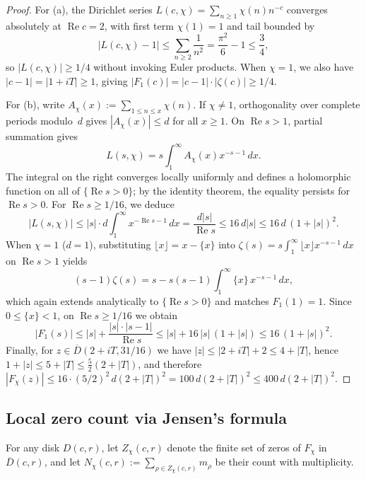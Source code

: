 \documentclass[11pt,reqno]{amsart}
\numberwithin{equation}{section}
\theoremstyle{definition}
\newcommand{\1}{\mathbf{1}}
\renewcommand{\Re}{\operatorname{Re}}
\begin{document}
\begin{proof}
For (a), the Dirichlet series $L(c, \chi) = \sum_{n \ge 1} \chi(n) n^{-c}$ converges absolutely at $\Re c = 2$, with first term $\chi(1) = 1$ and tail bounded by
\[
  \bigl|L(c, \chi) - 1\bigr| \le \sum_{n \ge 2} \frac{1}{n^2} = \frac{\pi^2}{6} - 1 \le \frac{3}{4},
\]
so $|L(c, \chi)| \ge 1/4$ without invoking Euler products. When $\chi = 1$, we also have $|c - 1| = |1 + iT| \ge 1$, giving $|F_1(c)| = |c-1|\cdot|\zeta(c)| \ge 1/4$.

For (b), write $A_\chi(x) := \sum_{1 \le n \le x} \chi(n)$. If $\chi \neq 1$, orthogonality over complete periods modulo~$d$ gives $|A_\chi(x)| \le d$ for all $x \ge 1$. On $\Re s > 1$, partial summation gives
\[
  L(s, \chi) = s \int_1^\infty A_\chi(x) x^{-s-1}\,dx.
\]
The integral on the right converges locally uniformly and defines a holomorphic function on all of $\{\Re s > 0\}$; by the identity theorem, the equality persists for $\Re s > 0$. For $\Re s \ge 1/16$, we deduce
\[
  |L(s, \chi)| \le |s| \cdot d \int_1^\infty x^{-\Re s - 1}\,dx = \frac{d |s|}{\Re s} \le 16\, d |s| \le 16\, d\,(1 + |s|)^2.
\]
When $\chi = 1$ ($d = 1$), substituting $\lfloor x \rfloor = x - \{x\}$ into $\zeta(s) = s \int_1^\infty \lfloor x\rfloor x^{-s-1}\,dx$ on $\Re s > 1$ yields
\[
  (s - 1)\zeta(s) = s - s(s - 1)\int_1^\infty \{x\}\, x^{-s-1}\,dx,
\]
which again extends analytically to $\{\Re s > 0\}$ and matches $F_1(1) = 1$. Since $0 \le \{x\} < 1$, on $\Re s \ge 1/16$ we obtain
\[
  |F_1(s)| \le |s| + \frac{|s|\cdot|s-1|}{\Re s} \le |s| + 16\,|s|\,(1+|s|) \le 16\,(1+|s|)^2.
\]
Finally, for $z \in \overline{D}(2+iT, 31/16)$ we have $|z| \le |2+iT| + 2 \le 4 + |T|$, hence $1 + |z| \le 5 + |T| \le \frac{5}{2}(2+|T|)$, and therefore $|F_\chi(z)| \le 16\cdot (5/2)^2\, d(2+|T|)^2 = 100\, d(2+|T|)^2 \le 400\, d(2+|T|)^2$.
\end{proof}

\subsection{Local zero count via Jensen's formula}

For any disk $D(c, r)$, let $Z_\chi(c, r)$ denote the finite set of zeros of $F_\chi$ in $\overline{D}(c, r)$, and let $N_\chi(c, r) := \sum_{\rho \in Z_\chi(c, r)} m_\rho$ be their count with multiplicity.
\end{document}
